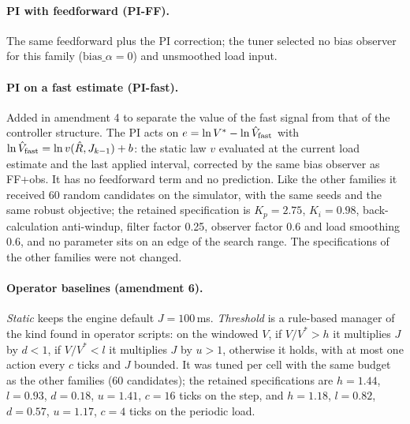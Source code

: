 \documentclass[smallextended]{svjour3}
\begin{document}
\paragraph{PI with feedforward (PI-FF).} The same feedforward plus the PI correction; the tuner selected no bias observer for this family ($\text{bias}\_\alpha=0$) and unsmoothed load input.
\paragraph{PI on a fast estimate (PI-fast).} Added in amendment 4 to separate the value of the fast signal from that of the controller structure. The PI acts on $e=\ln V^*-\ln\hat V_{\rm fast}$ with $\ln\hat V_{\rm fast}=\ln v(\hat R,J_{k-1})+b$: the static law $v$ evaluated at the current load estimate and the last applied interval, corrected by the same bias observer as FF+obs. It has no feedforward term and no prediction. Like the other families it received 60 random candidates on the simulator, with the same seeds and the same robust objective; the retained specification is $K_p=2.75$, $K_i=0.98$, back-calculation anti-windup, filter factor 0.25, observer factor 0.6 and load smoothing 0.6, and no parameter sits on an edge of the search range. The specifications of the other families were not changed.
\paragraph{Operator baselines (amendment 6).} \emph{Static} keeps the engine default $J=100$\,ms. \emph{Threshold} is a rule-based manager of the kind found in operator scripts: on the windowed $V$, if $V/V^*>h$ it multiplies $J$ by $d<1$, if $V/V^*<l$ it multiplies $J$ by $u>1$, otherwise it holds, with at most one action every $c$ ticks and $J$ bounded. It was tuned per cell with the same budget as the other families (60 candidates); the retained specifications are $h=1.44$, $l=0.93$, $d=0.18$, $u=1.41$, $c=16$ ticks on the step, and $h=1.18$, $l=0.82$, $d=0.57$, $u=1.17$, $c=4$ ticks on the periodic load.
\end{document}
